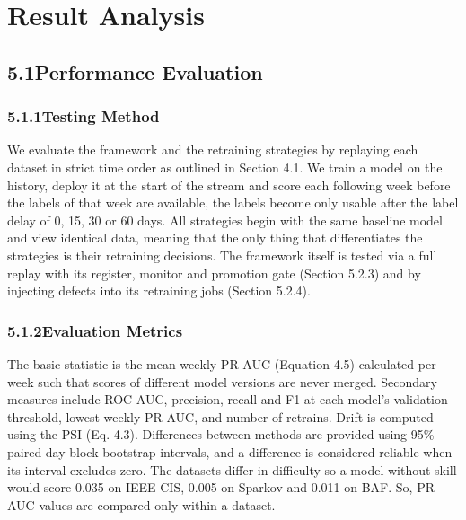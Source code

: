 \documentclass[11pt,letterpaper]{report}
\begin{document}
\setcounter{chapter}{4}
\chapter{Result Analysis}

\section*{5.1\quad Performance Evaluation}

\subsection*{5.1.1\quad Testing Method}

We evaluate the framework and the retraining strategies by replaying each dataset in strict time order as outlined in Section 4.1. We train a model on the history, deploy it at the start of the stream and score each following week before the labels of that week are available, the labels become only usable after the label delay of 0, 15, 30 or 60 days. All strategies begin with the same baseline model and view identical data, meaning that the only thing that differentiates the strategies is their retraining decisions. The framework itself is tested via a full replay with its register, monitor and promotion gate (Section 5.2.3) and by injecting defects into its retraining jobs (Section 5.2.4).

\subsection*{5.1.2\quad Evaluation Metrics}

The basic statistic is the mean weekly PR-AUC (Equation 4.5) calculated per week such that scores of different model versions are never merged. Secondary measures include ROC-AUC, precision, recall and F1 at each model's validation threshold, lowest weekly PR-AUC, and number of retrains. Drift is computed using the PSI (Eq. 4.3). Differences between methods are provided using 95\% paired day-block bootstrap intervals, and a difference is considered reliable when its interval excludes zero. The datasets differ in difficulty so a model without skill would score 0.035 on IEEE-CIS, 0.005 on Sparkov and 0.011 on BAF. So, PR-AUC values are compared only within a dataset.
\end{document}
